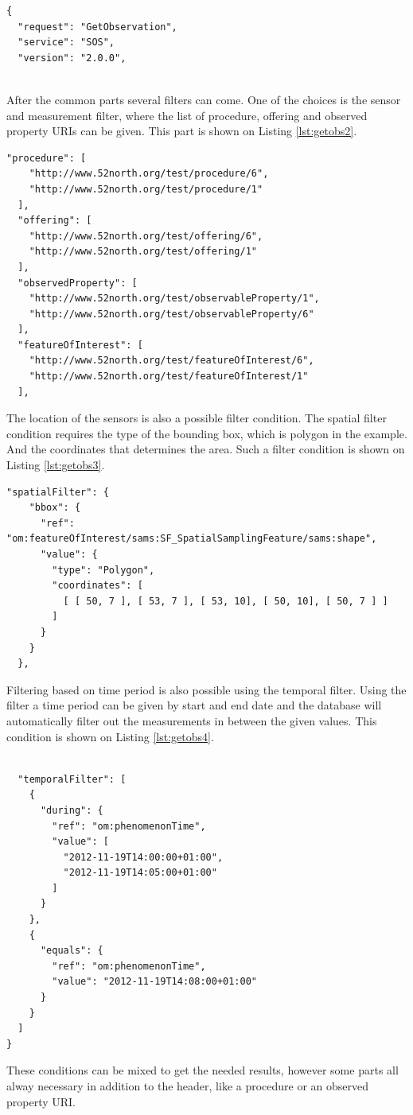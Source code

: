 \begin{lstlisting}[caption={JSON GetObservation POST request common header\label{lst:getobs1}}]
{
  "request": "GetObservation",
  "service": "SOS",
  "version": "2.0.0",
  
 \end{lstlisting}
 After the common parts several filters can come. One of the choices is the sensor and measurement filter, where the list of procedure, offering and observed property URIs can be given. This part is shown on Listing \ref{lst:getobs2}.
 
 \begin{lstlisting}[caption={JSON GetObservation POST request's sensor filter part\label{lst:getobs2}}]
  "procedure": [
    "http://www.52north.org/test/procedure/6",
    "http://www.52north.org/test/procedure/1"
  ],
  "offering": [
    "http://www.52north.org/test/offering/6",
    "http://www.52north.org/test/offering/1"
  ],
  "observedProperty": [
    "http://www.52north.org/test/observableProperty/1",
    "http://www.52north.org/test/observableProperty/6"
  ],
  "featureOfInterest": [
    "http://www.52north.org/test/featureOfInterest/6",
    "http://www.52north.org/test/featureOfInterest/1"
  ],
\end{lstlisting}

The location of the sensors is also a possible filter condition. The spatial filter condition requires the type of the bounding box, which is polygon in the example. And the coordinates that determines the area. Such a filter condition is shown on Listing \ref{lst:getobs3}.

\begin{lstlisting}[caption={JSON GetObservation POST request's spatial filter part\label{lst:getobs3}}]
  "spatialFilter": {
    "bbox": {
      "ref": "om:featureOfInterest/sams:SF_SpatialSamplingFeature/sams:shape",
      "value": {
        "type": "Polygon",
        "coordinates": [
          [ [ 50, 7 ], [ 53, 7 ], [ 53, 10], [ 50, 10], [ 50, 7 ] ]
        ]
      }
    }
  },
\end{lstlisting}

Filtering based on time period is also possible using the temporal filter. Using the filter a time period can be given by start and end date and the database will automatically filter out the measurements in between the given values. 
This condition is shown on Listing \ref{lst:getobs4}.
\begin{lstlisting}[caption={JSON GetObservation POST request's temporal filter part\label{lst:getobs4}}]

  "temporalFilter": [
    {
      "during": {
        "ref": "om:phenomenonTime",
        "value": [
          "2012-11-19T14:00:00+01:00",
          "2012-11-19T14:05:00+01:00"
        ]
      }
    },
    { 
      "equals": {
        "ref": "om:phenomenonTime",
        "value": "2012-11-19T14:08:00+01:00"
      }
    }
  ]
}
\end{lstlisting}
These conditions can be mixed to get the needed results, however some parts all alway necessary in addition to the header, like a procedure or an observed property URI.

